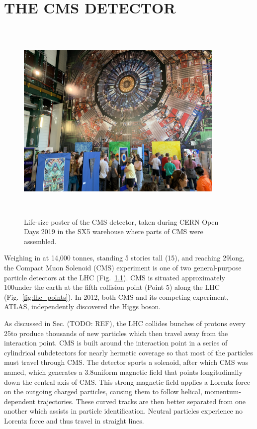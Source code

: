 \chapter{THE CMS DETECTOR} 
\label{ch:cms}
\begin{figure}[pbth]
\centering
\includegraphics[width=10cm,height=10cm,keepaspectratio]{figures/cms/cms_poster_SX5.jpg}
    \caption{
    Life-size poster of the CMS detector, taken during CERN Open Days 2019
    in the SX5 warehouse where parts of CMS were assembled.}
    \label{fig:cms_poster}
\end{figure}
Weighing in at 14,000 tonnes, standing 5 stories tall (15\meter), and reaching 29\meter long, the Compact Muon Solenoid (CMS) experiment is one of two general-purpose particle detectors at the LHC (Fig.~\ref{fig:cms_poster}).
CMS is situated approximately 100\meter under the earth at the fifth collision point (Point 5) along the LHC (Fig.~\ref{fig:lhc_points}).
In 2012, both CMS and its competing experiment, ATLAS, independently discovered the Higgs boson.

As discussed in Sec. (TODO: REF), the LHC collides bunches of protons every 25\ns to produce thousands of new particles which then travel away from the interaction point.
CMS is built around the interaction point in a series of cylindrical subdetectors for nearly hermetic coverage so that most of the particles must travel through CMS.
The detector sports a solenoid, after which CMS was named, which generates a 3.8\tesla uniform magnetic field that points longitudinally down the central axis of CMS.
This strong magnetic field applies a Lorentz force on the outgoing charged particles, causing them to follow helical, momentum-dependent trajectories.
These curved tracks are then better separated from one another which assists in particle identification.
Neutral particles experience no Lorentz force and thus travel in straight lines.

